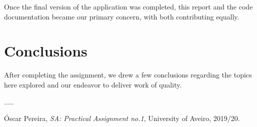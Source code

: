 \documentclass[12pt]{article}
\begin{document}
Once the final version of the application was completed, this report and the code documentation became our primary concern, with both contributing equally.


\newpage
\section{Conclusions} %

After completing the assignment, we drew a few conclusions regarding the topics here explored and our endeavor to deliver work of quality.

.....

\begin{thebibliography}{9} %
  

    Óscar Pereira,
    \textit{SA: Practical Assignment no.1},
    University of Aveiro,
    2019/20.
  

  
\end{thebibliography}

\clearpage
\end{document}
